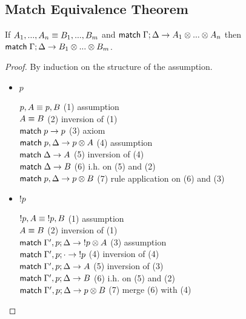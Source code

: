 \subsection{Match Equivalence Theorem}

\begin{theorem}
If $A_1, ..., A_n \equiv B_1, ..., B_m$ and $\mathsf{match} \; \Gamma ; \Delta \rightarrow A_1 \otimes ... \otimes A_n$ then $\mathsf{match} \; \Gamma; \Delta \rightarrow B_1 \otimes ... \otimes B_m$.
\end{theorem}

\begin{proof}
   By induction on the structure of the assumption.
   
   \begin{itemize}
      \item $p$
      
      $p, A \equiv p, B$ \hfill (1) assumption \\
      $A \equiv B$ \hfill (2) inversion of (1) \\
      $\mathsf{match} \; p \rightarrow p$ \hfill (3) axiom \\
      $\mathsf{match} \; p, \Delta \rightarrow p \otimes A$ \hfill (4) assumption \\
      $\mathsf{match} \; \Delta \rightarrow A$ \hfill (5) inversion of (4) \\
      $\mathsf{match} \; \Delta \rightarrow B$ \hfill (6) i.h. on (5) and (2) \\
      $\mathsf{match} \; p, \Delta \rightarrow p \otimes B$ \hfill (7) rule application on (6) and (3) \\
      
      \item ${!} p$
      
      ${!} p, A \equiv {!} p, B$ \hfill (1) assumption \\
      $A \equiv B$ \hfill (2) inversion of (1) \\
      $\mathsf{match} \; \Gamma', p; \Delta \rightarrow {!} p \otimes A$ \hfill (3) assumption \\
      $\mathsf{match} \; \Gamma', p; \cdot \rightarrow {!} p$ \hfill (4) inversion of (4) \\
      $\mathsf{match} \; \Gamma', p; \Delta \rightarrow A$ \hfill (5) inversion of (3) \\
      $\mathsf{match} \; \Gamma', p; \Delta \rightarrow B$ \hfill (6) i.h. on (5) and (2) \\
      $\mathsf{match} \; \Gamma', p; \Delta \rightarrow p \otimes B$ \hfill (7) merge (6) with (4) \\
      

\end{itemize}
\end{proof}
